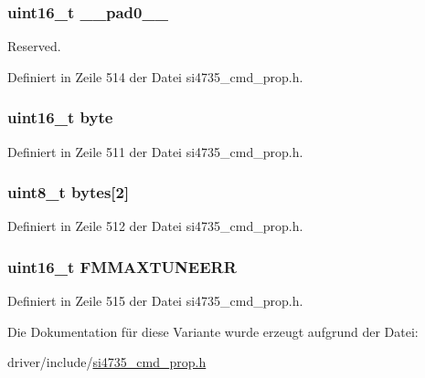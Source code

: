 \subsubsection[{\+\_\+\+\_\+pad0\+\_\+\+\_\+}]{\setlength{\rightskip}{0pt plus 5cm}uint16\+\_\+t \+\_\+\+\_\+pad0\+\_\+\+\_\+}\label{unionfm__max__tune__err_a77132c2c26a75f5b8751b235cda23828}


Reserved. 



Definiert in Zeile 514 der Datei si4735\+\_\+cmd\+\_\+prop.\+h.

\hypertarget{unionfm__max__tune__err_ab0549c1b5ea980a02e7eab77e21fea49}{}
\subsubsection[{byte}]{\setlength{\rightskip}{0pt plus 5cm}uint16\+\_\+t byte}\label{unionfm__max__tune__err_ab0549c1b5ea980a02e7eab77e21fea49}


Definiert in Zeile 511 der Datei si4735\+\_\+cmd\+\_\+prop.\+h.

\hypertarget{unionfm__max__tune__err_a46e4c05d20a047ec169f60d3167e912e}{}
\subsubsection[{bytes}]{\setlength{\rightskip}{0pt plus 5cm}uint8\+\_\+t bytes\mbox{[}2\mbox{]}}\label{unionfm__max__tune__err_a46e4c05d20a047ec169f60d3167e912e}


Definiert in Zeile 512 der Datei si4735\+\_\+cmd\+\_\+prop.\+h.

\hypertarget{unionfm__max__tune__err_a89a109f2f7c80bdca8ffa991e3d8b2b7}{}
\subsubsection[{F\+M\+M\+A\+X\+T\+U\+N\+E\+E\+R\+R}]{\setlength{\rightskip}{0pt plus 5cm}uint16\+\_\+t F\+M\+M\+A\+X\+T\+U\+N\+E\+E\+R\+R}\label{unionfm__max__tune__err_a89a109f2f7c80bdca8ffa991e3d8b2b7}


Definiert in Zeile 515 der Datei si4735\+\_\+cmd\+\_\+prop.\+h.



Die Dokumentation für diese Variante wurde erzeugt aufgrund der Datei\+:\begin{DoxyCompactItemize}
\item 
driver/include/\hyperlink{si4735__cmd__prop_8h}{si4735\+\_\+cmd\+\_\+prop.\+h}\end{DoxyCompactItemize}

